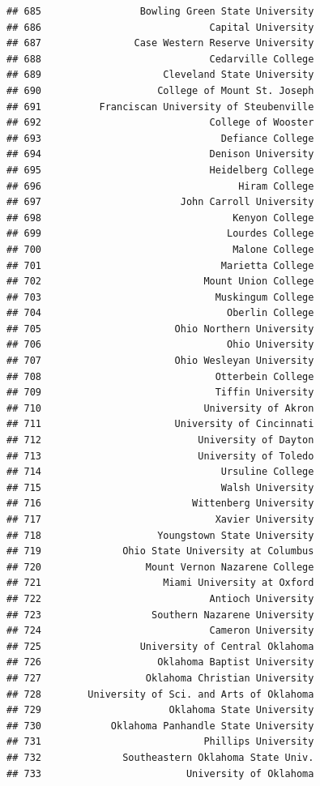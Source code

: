 \documentclass[]{article}
\begin{document}
\begin{verbatim}
## 685                 Bowling Green State University
## 686                             Capital University
## 687                Case Western Reserve University
## 688                             Cedarville College
## 689                     Cleveland State University
## 690                    College of Mount St. Joseph
## 691          Franciscan University of Steubenville
## 692                             College of Wooster
## 693                               Defiance College
## 694                             Denison University
## 695                             Heidelberg College
## 696                                  Hiram College
## 697                        John Carroll University
## 698                                 Kenyon College
## 699                                Lourdes College
## 700                                 Malone College
## 701                               Marietta College
## 702                            Mount Union College
## 703                              Muskingum College
## 704                                Oberlin College
## 705                       Ohio Northern University
## 706                                Ohio University
## 707                       Ohio Wesleyan University
## 708                              Otterbein College
## 709                              Tiffin University
## 710                            University of Akron
## 711                       University of Cincinnati
## 712                           University of Dayton
## 713                           University of Toledo
## 714                               Ursuline College
## 715                               Walsh University
## 716                          Wittenberg University
## 717                              Xavier University
## 718                    Youngstown State University
## 719              Ohio State University at Columbus
## 720                  Mount Vernon Nazarene College
## 721                     Miami University at Oxford
## 722                             Antioch University
## 723                   Southern Nazarene University
## 724                             Cameron University
## 725                 University of Central Oklahoma
## 726                    Oklahoma Baptist University
## 727                  Oklahoma Christian University
## 728        University of Sci. and Arts of Oklahoma
## 729                      Oklahoma State University
## 730            Oklahoma Panhandle State University
## 731                            Phillips University
## 732              Southeastern Oklahoma State Univ.
## 733                         University of Oklahoma

\end{verbatim}
\end{document}
